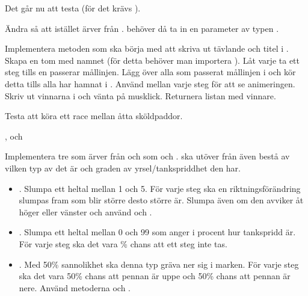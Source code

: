 \Subtask Det går nu att testa  (för det krävs ).

\Subtask Ändra så att  istället ärver från .  behöver då ta in en parameter av typen .

\Task {}

\Subtask Implementera metoden  som ska börja med att skriva ut tävlande och titel i . Skapa en tom  med namnet  (för detta behöver man importera ). Låt varje  ta ett steg tills en passerar mållinjen. Lägg över alla som passerat mållinjen i  och kör detta tills alla  har hamnat i . Använd  mellan varje steg för att se animeringen. Skriv ut vinnarna i  och vänta på musklick. Returnera listan med vinnare.

\Subtask Testa att köra ett race mellan åtta sköldpaddor.

\Task {},  och 

\Subtask Implementera tre  som ärver från  och som   och .  ska utöver  från  även bestå av vilken typ av  det är och graden av yrsel/tankspriddhet den har.

\begin{itemize}

\item {}. Slumpa ett heltal  mellan 1 och 5. För varje steg ska en riktningsförändring slumpas fram som blir större desto större  är. Slumpa även om den avviker åt höger eller vänster och använd  och .

\item {}. Slumpa ett heltal  mellan 0 och 99 som anger i procent hur tankspridd  är. För varje steg ska det vara \% chans att ett steg inte tas.

\item {}. Med 50\% sannolikhet ska denna typ  gräva ner sig i marken. För varje steg ska det vara 50\% chans att pennan är uppe och 50\% chans att pennan är nere. Använd metoderna  och .

\end{itemize}


